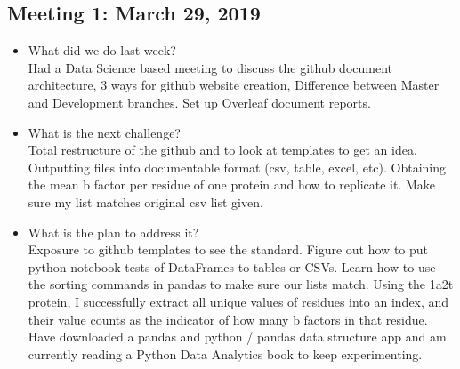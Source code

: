 \documentclass{article}
\begin{document}
\subsection*{Meeting 1: March 29, 2019}
    \begin{itemize}
        \item What did we do last week? \\ 
        Had a Data Science based meeting to discuss the github document architecture, 3 ways for github website creation, Difference between Master and Development branches. Set up Overleaf document reports.
        \item What is the next challenge? \\ 
        Total restructure of the github and to look at templates to get an idea.  Outputting files into documentable format (csv, table, excel, etc).  Obtaining the mean b factor per residue of one protein and how to replicate it. Make sure my list matches original csv list given. 
        \item What is the plan to address it? \\ 
        Exposure to github templates to see the standard. Figure out how to put python notebook tests of DataFrames to tables or CSVs.  Learn how to use the sorting commands in pandas to make sure our lists match.  Using the 1a2t protein, I successfully extract all unique values of residues into an index, and their value counts as the indicator of how many b factors in that residue.  Have downloaded a pandas and python / pandas data structure app and am currently reading a Python Data Analytics book to keep experimenting. 
        
    \end{itemize}
\end{document}
